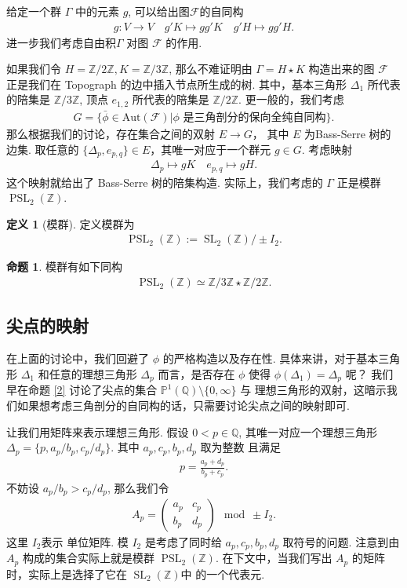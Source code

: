 \documentclass[10pt,UTF8]{ctexart}
\renewcommand{\P}{\mathbb{P}}
\newcommand{\Z}{\mathbb{Z}}
\newcommand{\Q}{\mathbb{Q}}
\newcommand{\SL}{\operatorname{SL}_2(\Z)}
\newcommand{\PSL}{\operatorname{PSL}_2(\Z)}
\theoremstyle{definition}
\newtheorem{proposition}[theorem]{命题}
\newtheorem{definition}[theorem]{定义}
\theoremstyle{remark}
\begin{document}
给定一个群 $\Gamma$ 中的元素 $g$, 可以给出图$\mathcal{F}$的自同构 
\begin{align*}
    g: V \to V \quad g'K \mapsto gg'K \quad g'H \mapsto gg'H.
\end{align*} 
进一步我们考虑自由积$\Gamma$ 对图 $\mathcal{F}$ 的作用. 

如果我们令 $H=\mathbb{Z}/2\mathbb{Z},K=\mathbb{Z}/3\mathbb{Z}$, 那么不难证明由
$\Gamma= H \star K $ 构造出来的图 $\mathcal{F}$ 正是我们在 Topograph 的边中插入节点所生成的树. 
其中，基本三角形 $\Delta_1$ 所代表的陪集是 $\mathbb{Z}/3\mathbb{Z}$, 顶点 $e_{1,2}$ 所代表的陪集是 $\mathbb{Z}/2\mathbb{Z}$. 
更一般的，我们考虑 
\begin{align*}
    G = \{\bar{\phi}\in \text{Aut}(\mathcal{F})| \phi\text{ 是三角剖分的保向全纯自同构}\}.
\end{align*}
那么根据我们的讨论，存在集合之间的双射 $E\to G$， 其中 $E$ 为Bass-Serre 树的边集. 取任意的 $\{\Delta_p,e_{p,q}\}\in E$，其唯一对应于一个群元 $g\in G$. 考虑映射 
\begin{align*}
    \Delta_p \mapsto g K \quad e_{p,q}\mapsto gH.
\end{align*}
这个映射就给出了 Bass-Serre 树的陪集构造. 实际上，我们考虑的 $\Gamma$ 正是模群 $\PSL$.

\begin{definition}[模群]
    定义模群为
    \begin{align*}
        \PSL := \SL/\pm I_2.
    \end{align*}
\end{definition}
\begin{proposition}
    模群有如下同构 
    \begin{align*}
        \PSL \simeq \mathbb{Z}/3\mathbb{Z}\star \mathbb{Z}/2\mathbb{Z}.
    \end{align*}
\end{proposition}
\subsection{尖点的映射}
在上面的讨论中，我们回避了 $\phi$ 的严格构造以及存在性. 具体来讲，对于基本三角形 $\Delta_1$ 和任意的理想三角形 $\Delta_p$ 而言，是否存在 $\phi$ 使得 $\phi(\Delta_1) = \Delta_p$ 呢？ 
我们早在命题 { \ref{2}} 讨论了尖点的集合 $\P^1(\Q)\setminus\{0,\infty\}$ 与 理想三角形的双射，这暗示我们如果想考虑三角剖分的自同构的话，只需要讨论尖点之间的映射即可. 

让我们用矩阵来表示理想三角形. 假设 $0<p\in\Q$, 其唯一对应一个理想三角形 $\Delta_p=\{p,a_p/b_p,c_p/d_p\}$.
其中 $a_p,c_p,b_p,d_p$ 取为整数 且满足 
\begin{align*}
    p = \frac{a_p+d_p}{b_p+c_p}. 
\end{align*}
不妨设 $a_p/b_p>c_p/d_p$, 那么我们令 
\begin{align*}
    A_p = \begin{pmatrix} a_p & c_p \\ b_p & d_p \end{pmatrix} \mod \pm I_2.
\end{align*}
这里 $I_2$表示 单位矩阵. 模 $I_2$ 是考虑了同时给 $a_p,c_p,b_p,d_p$ 取符号的问题. 注意到由 $A_p$ 构成的集合实际上就是模群 $\PSL$.
在下文中，当我们写出 $A_p$ 的矩阵时，实际上是选择了它在 $\SL$中 的一个代表元. 
\end{document}
